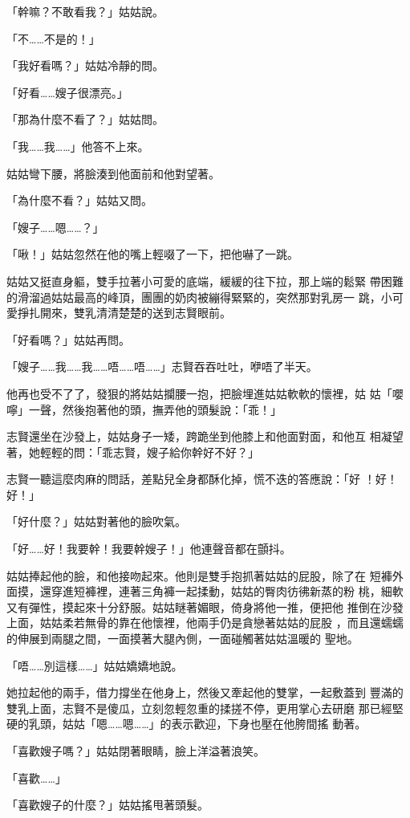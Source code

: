 「幹嘛？不敢看我？」姑姑說。

「不……不是的！」

「我好看嗎？」姑姑冷靜的問。

「好看……嫂子很漂亮。」

「那為什麼不看了？」姑姑問。

「我……我……」他答不上來。

姑姑彎下腰，將臉湊到他面前和他對望著。

「為什麼不看？」姑姑又問。

「嫂子……嗯……？」

「啾！」姑姑忽然在他的嘴上輕啜了一下，把他嚇了一跳。

姑姑又挺直身軀，雙手拉著小可愛的底端，緩緩的往下拉，那上端的鬆緊
帶困難的滑溜過姑姑最高的峰頂，團團的奶肉被繃得緊緊的，突然那對乳房一
跳，小可愛掙扎開來，雙乳清清楚楚的送到志賢眼前。

「好看嗎？」姑姑再問。

「嫂子……我……我……唔……唔……」志賢吞吞吐吐，咿唔了半天。

他再也受不了了，發狠的將姑姑攔腰一抱，把臉埋進姑姑軟軟的懷裡，姑
姑「嚶嚀」一聲，然後抱著他的頭，撫弄他的頭髮說：「乖！」

志賢還坐在沙發上，姑姑身子一矮，跨跪坐到他膝上和他面對面，和他互
相凝望著，她輕輕的問：「乖志賢，嫂子給你幹好不好？」

志賢一聽這麼肉麻的問話，差點兒全身都酥化掉，慌不迭的答應說：「好
！好！好！」

「好什麼？」姑姑對著他的臉吹氣。

「好……好！我要幹！我要幹嫂子！」他連聲音都在顫抖。

姑姑捧起他的臉，和他接吻起來。他則是雙手抱抓著姑姑的屁股，除了在
短褲外面摸，還穿進短褲裡，連著三角褲一起揉動，姑姑的臀肉彷彿新蒸的粉
桃，細軟又有彈性，摸起來十分舒服。姑姑瞇著媚眼，倚身將他一推，便把他
推倒在沙發上面，姑姑柔若無骨的靠在他懷裡，他兩手仍是貪戀著姑姑的屁股
，而且還蠕蠕的伸展到兩腿之間，一面摸著大腿內側，一面碰觸著姑姑溫暖的
聖地。

「唔……別這樣……」姑姑嬌嬌地說。

她拉起他的兩手，借力撐坐在他身上，然後又牽起他的雙掌，一起敷蓋到
豐滿的雙乳上面，志賢不是傻瓜，立刻忽輕忽重的揉搓不停，更用掌心去研磨
那已經堅硬的乳頭，姑姑「嗯……嗯……」的表示歡迎，下身也壓在他胯間搖
動著。

「喜歡嫂子嗎？」姑姑閉著眼睛，臉上洋溢著浪笑。

「喜歡……」

「喜歡嫂子的什麼？」姑姑搖甩著頭髮。

